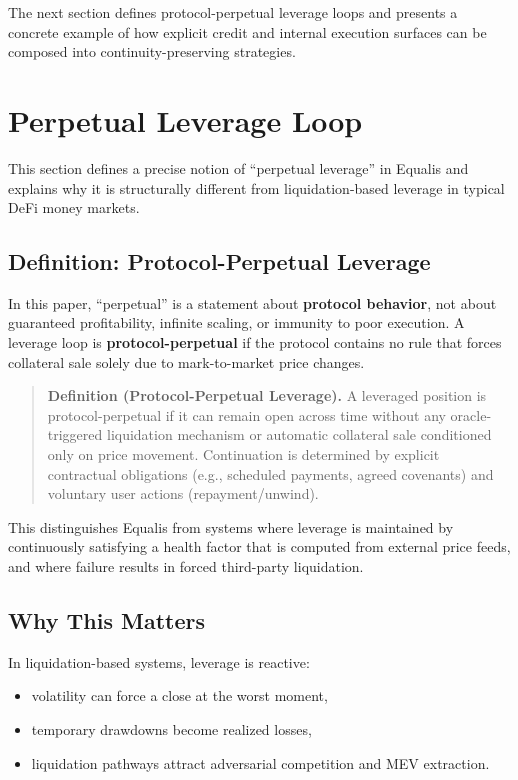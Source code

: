\documentclass[version=preprint]{iacrcc}
\begin{document}
The next section defines protocol-perpetual leverage loops and presents a concrete example of how explicit credit and internal execution surfaces can be composed into continuity-preserving strategies.

\section{Perpetual Leverage Loop}

This section defines a precise notion of ``perpetual leverage'' in Equalis and explains why it is structurally different from liquidation-based leverage in typical DeFi money markets.

\subsection{Definition: Protocol-Perpetual Leverage}

In this paper, ``perpetual'' is a statement about \textbf{protocol behavior}, not about guaranteed profitability, infinite scaling, or immunity to poor execution. A leverage loop is \textbf{protocol-perpetual} if the protocol contains no rule that forces collateral sale solely due to mark-to-market price changes.

\begin{quote}
\textbf{Definition (Protocol-Perpetual Leverage).} A leveraged position is protocol-perpetual if it can remain open across time without any oracle-triggered liquidation mechanism or automatic collateral sale conditioned only on price movement. Continuation is determined by explicit contractual obligations (e.g., scheduled payments, agreed covenants) and voluntary user actions (repayment/unwind).
\end{quote}

This distinguishes Equalis from systems where leverage is maintained by continuously satisfying a health factor that is computed from external price feeds, and where failure results in forced third-party liquidation.

\subsection{Why This Matters}

In liquidation-based systems, leverage is reactive:
\begin{itemize}
  \item volatility can force a close at the worst moment,
  \item temporary drawdowns become realized losses,
  \item liquidation pathways attract adversarial competition and MEV extraction.
\end{itemize}
\end{document}
